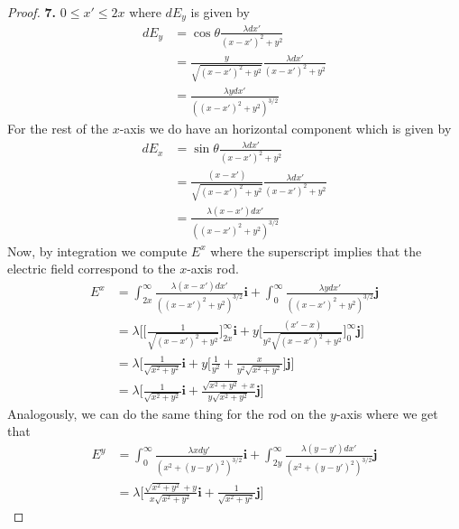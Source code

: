 \documentclass[11pt]{article}
\newcommand{\uvi}{\bm{i}}
\newcommand{\uvj}{\bm{j}}
\theoremstyle{definition}
\begin{document}
\begin{proof}{\textbf{7.}}
    $0 \leq x' \leq 2x$ where $dE_y$ is given by
    \begin{align*}
        dE_y &= \cos\theta\frac{\lambda dx'}{(x - x')^2 + y^2}\\
        &= \frac{y}{\sqrt{(x-x')^2 + y^2}}\frac{\lambda dx'}{(x - x')^2 + y^2}\\
        &= \frac{\lambda y dx'}{((x - x')^2 + y^2)^{3/2}}
    \end{align*}
    For the rest of the $x$-axis we do have an horizontal component which is
    given by
    \begin{align*}
        dE_x &= \sin\theta\frac{\lambda dx'}{(x - x')^2 + y^2}\\
        &= \frac{(x-x')}{\sqrt{(x-x')^2 + y^2}}\frac{\lambda dx'}{(x - x')^2 + y^2}\\
        &= \frac{\lambda (x - x') dx'}{((x - x')^2 + y^2)^{3/2}}
    \end{align*}
    Now, by integration we compute $E^x$ where the superscript implies that
    the electric field correspond to the $x$-axis rod.
    \begin{align*}
        E^x &=
        \int_{2x}^\infty \frac{\lambda (x - x') dx'}{((x - x')^2 + y^2)^{3/2}}\bm{i}
        + \int_0^\infty \frac{\lambda y dx'}{((x - x')^2 + y^2)^{3/2}}\bm{j}\\
        &= \lambda\bigg[
            \bigg[\frac{1}{\sqrt{(x - x')^2 + y^2}}\bigg]_{2x}^\infty\uvi
            + y\bigg[\frac{(x'-x)}{y^2\sqrt{(x - x')^2 + y^2}}\bigg]_{0}^\infty\uvj
        \bigg]\\
        &= \lambda\bigg[
            \frac{1}{\sqrt{x^2 + y^2}}\uvi
            + y\bigg[
                \frac{1}{y^2} + \frac{x}{y^2\sqrt{x^2 + y^2}}
            \bigg]\uvj
        \bigg]\\
        &= \lambda\bigg[
            \frac{1}{\sqrt{x^2 + y^2}}\uvi
            + \frac{\sqrt{x^2 + y^2} + x}{y\sqrt{x^2 + y^2}}\uvj
        \bigg]
    \end{align*}
    Analogously, we can do the same thing for the rod on the $y$-axis where we
    get that
    \begin{align*}
        E^y &=
        \int_0^\infty \frac{\lambda x dy'}{(x^2 + (y - y')^2)^{3/2}}\uvi
        + \int_{2y}^\infty \frac{\lambda (y - y') dx'}{(x^2 + (y - y')^2)^{3/2}}\uvj\\
        &= \lambda\bigg[
            \frac{\sqrt{x^2 + y^2} + y}{x\sqrt{x^2 + y^2}}\uvi
            + \frac{1}{\sqrt{x^2 + y^2}}\uvj
            \bigg]
    \end{align*}

\end{proof}
\end{document}

